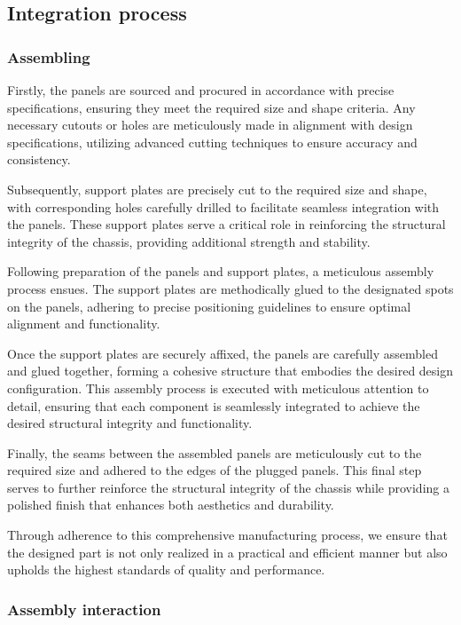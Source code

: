\subsection{Integration process}


\subsubsection{Assembling}

Firstly, the panels are sourced and procured in accordance with precise specifications, ensuring they meet the required size and shape criteria. Any necessary cutouts or holes are meticulously made in alignment with design specifications, utilizing advanced cutting techniques to ensure accuracy and consistency.

Subsequently, support plates are precisely cut to the required size and shape, with corresponding holes carefully drilled to facilitate seamless integration with the panels. These support plates serve a critical role in reinforcing the structural integrity of the chassis, providing additional strength and stability.

Following preparation of the panels and support plates, a meticulous assembly process ensues. The support plates are methodically glued to the designated spots on the panels, adhering to precise positioning guidelines to ensure optimal alignment and functionality.

Once the support plates are securely affixed, the panels are carefully assembled and glued together, forming a cohesive structure that embodies the desired design configuration. This assembly process is executed with meticulous attention to detail, ensuring that each component is seamlessly integrated to achieve the desired structural integrity and functionality.

Finally, the seams between the assembled panels are meticulously cut to the required size and adhered to the edges of the plugged panels. This final step serves to further reinforce the structural integrity of the chassis while providing a polished finish that enhances both aesthetics and durability.

Through adherence to this comprehensive manufacturing process, we ensure that the designed part is not only realized in a practical and efficient manner but also upholds the highest standards of quality and performance.

\subsubsection{Assembly interaction}


